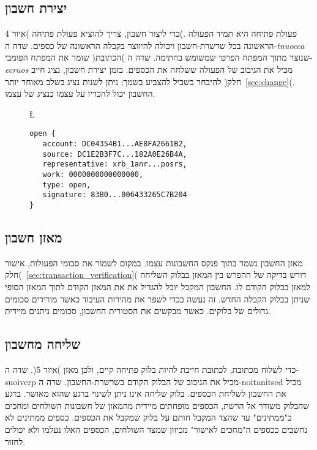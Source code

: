 \subsection{יצירת חשבון}\label{sec:open}
כדי ליצור חשבון, צריך להוציא פעולת פתיחה )איור 4(. פעולת פתיחה היא תמיד הפעולה הראשונה בכל שרשרת-חשבון ויכולה להיווצר בקבלה הראשונה של כספים. שדה ה-\textit{tnuocca} שומר את המפתח הפומבי )הכתובת( שנוצר מתוך המפתח הפרטי שמשומש בחתימה. שדה ה-\textit{ecruos} מכיל את הגיבוב של הפעולה ששלחה את הכספים. בזמן יצירת חשבון, נציג חייב להיבחר בשביל להצביע בשמך; ניתן לשנות נציג בשלב מאוחר יותר )חלק~\ref{sec:change}(. החשבון יכול להכריז על עצמו כנציג של עצמו.

\begin{figure}[!ht]
\L{
\begin{lstlisting}
open {
   account: DC04354B1...AE8FA2661B2,
   source: DC1E2B3F7C...182A0E26B4A,
   representative: xrb_1anr...posrs,
   work: 0000000000000000,
   type: open,
   signature: 83B0...006433265C7B204
}
\end{lstlisting}

\label{code:open}
}
\end{figure}

\subsection{מאזן חשבון}\label{sec:account_balance}
מאזן החשבון נשמר בתוך פנקס החשבונות עצמו. במקום  לשמור את סכומי הפעולות, אישור )חלק~\ref{sec:transaction_verification}( דורש בדיקה של ההפרש בין המאזן בבלוק השליחה למאזן בבלוק הקודם לו. החשבון המקבל יוכל להגדיל את את המאזן הקודם לתוך המאזן הסופי שניתן בבלוק הקבלה החדש. זה נעשה בכדי לשפר את מהירות העיבוד כאשר מורידים סכומים גדולים של בלוקים. כאשר מבקשים את הסטורית החשבון, סכומים ניתנים מיידית.

\subsection{שליחה מחשבון} \label{sec:send}
כדי לשלוח מכתובת, לכתובת חייבת להיות בלוק פתיחה קיים, ולכן מאזן )איור 5(. שדה ה-suoiverp מכיל את הגיבוב של הבלוק הקודם בשרשרת-החשבון. שדה ה-noitanitsed מכיל את החשבון לשליחת הכספים. בלוק שליחה אינו ניתן לשינוי ברגע שהוא מאושר. ברגע שהבלוק משודר אל הרשת, הכספים מופחתים מיידית מהמאזן של חשבונות השולחים ומחכים כ"ממתינים" עד שהצד המקבל חותם על בלוק שמקבל את הכספים. כספים ממתינים לא נחשבים ככספים ה"מחכים לאישור" מכיוון שמצד השולחים, הכספים האלו נעלמו ולא יכולים לחזור.

